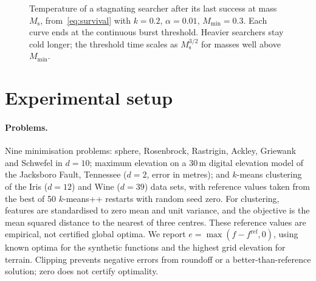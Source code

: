 \documentclass[10pt,a4paper]{article}
\begin{document}
\begin{figure}[t]
\centering
{}
\caption{Temperature of a stagnating searcher after its last success at mass
$M_{\mathrm s}$, from~\eqref{eq:survival} with $k=0.2$, $\alpha=0.01$, $M_{\min}=0.3$. Each
curve ends at the continuous burst threshold. Heavier searchers stay cold longer; the threshold time scales as
$M_{\mathrm s}^{3/2}$ for masses well above $M_{\min}$.}
\label{fig:trajectory}
\end{figure}

\section{Experimental setup}
\label{sec:setup}

\paragraph{Problems.} Nine minimisation problems: sphere, Rosenbrock, Rastrigin,
Ackley, Griewank and Schwefel in $d=10$; maximum elevation on a $30$\,m digital
elevation model of the Jacksboro Fault, Tennessee ($d=2$, error in metres); and
$k$-means clustering of the Iris ($d=12$) and Wine ($d=39$) data sets, with reference
values taken from the best of 50 $k$-means++ restarts with random seed zero.
For clustering, features are standardised to zero mean and unit variance, and the
objective is the mean squared distance to the nearest of three centres. These
reference values are empirical, not certified global optima. We report
$e=\max(f-f^{\mathrm{ref}},0)$, using known optima for the synthetic functions and
the highest grid elevation for terrain. Clipping prevents negative errors from
roundoff or a better-than-reference solution; zero does not certify optimality.
\end{document}
